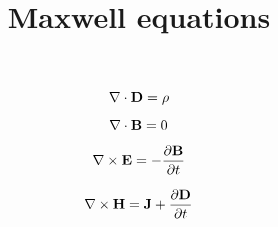 \documentclass{article}
\title{Maxwell equations}
\begin{document}
\begin{equation}
\nabla\cdot{\bf D} = \rho 
\end{equation}

\begin{equation}
\nabla\cdot{\bf B} = 0 
\end{equation}

\begin{equation}
\nabla\times{\bf E} = - {{\partial{\bf B}}\over{\partial t}} 
\end{equation}

\begin{equation}
\nabla\times{\bf H} = {\bf J} + {{\partial{\bf D}}\over{\partial t}} 
\end{equation}
\end{document}
